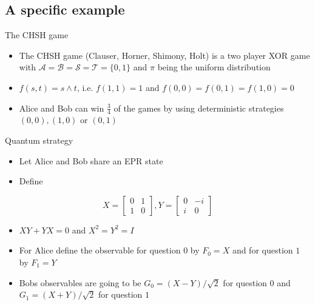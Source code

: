 \subsection{A specific example}
\begin{frame}{The CHSH game}
\begin{itemize}
    \item The CHSH game (Clauser, Horner, Shimony, Holt) is a two player XOR game with $\mathcal{A} = \mathcal{B} = \mathcal{S} = \mathcal{T} = \{0,1\}$ and $\pi$ being the uniform distribution
    \item  $f(s,t)= s \land t$, i.e. $f(1,1)=1$ and $f(0,0)=f(0,1)=f(1,0)=0$
    \item Alice and Bob can win $\frac{3}{4}$ of the games by using deterministic strategies $(0,0), (1,0) \text{ or } (0,1)$
\end{itemize}
\end{frame}

\begin{frame}{Quantum strategy}
\begin{itemize}
    \item Let Alice and Bob share an EPR state
    \item Define 
\end{itemize}
    \begin{equation*}
X = \begin{bmatrix}
0 & 1 \\
1 & 0
\end{bmatrix} , Y = \begin{bmatrix}
0 & -i \\ 
i & 0 
\end{bmatrix}
\end{equation*}
\begin{itemize}
    \item $XY +YX = 0$ and $X^2=Y^2=I$
    \item For Alice define the observable for question $0$ by $F_0=X$ and for question $1$ by $F_1=Y$
    \item Bobs observables are going to be $G_0 = (X-Y)/ \sqrt{2}$ for question $0$ and $G_1 = (X+Y)/\sqrt{2}$ for question $1$
\end{itemize}
\end{frame}

